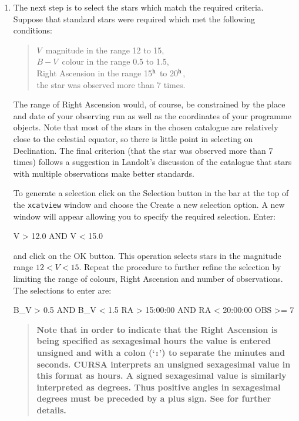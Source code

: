 \documentclass[twoside,11pt,nolof]{starlink}
\begin{document}
\begin{enumerate}
  \item The next step is to select the stars which match the required
   criteria.  Suppose that standard stars were required which met the
   following conditions:

  \begin{verse}
   $V$\, magnitude in the range 12 to 15,      \\
   $B - V$\, colour in the range 0.5 to 1.5,   \\
   Right Ascension in the range 15$^{\rm h}$ to 20$^{\rm h}$, \\
   the star was observed more than 7 times.
  \end{verse}

   The range of Right Ascension would, of course, be constrained by
   the place and date of your observing run as well as the coordinates
   of your programme objects.  Note that most of the stars in the chosen
   catalogue are relatively close to the celestial equator, so there is
   little point in selecting on Declination.  The final criterion (that
   the star was observed more than 7 times) follows a suggestion in
   Landolt's discussion of the catalogue\cite{LANDOLT92} that stars with
   multiple observations make better standards.

   To generate a selection click on the \textsf{Selection} button in the
   bar at the top of the \texttt{xcatview} window and choose the \textsf{Create a new selection} option.  A new window will appear allowing
   you to specify the required selection.  Enter:

\begin{terminalv}
V > 12.0 AND V < 15.0
\end{terminalv}

   and click on the \textsf{OK} button.  This operation selects stars in
   the magnitude range $12 < V < 15$.  Repeat the procedure to further
   refine the selection by limiting the range of colours, Right Ascension
   and number of observations.  The selections to enter are:

\begin{terminalv}
B_V > 0.5 AND B_V < 1.5
RA > 15:00:00 AND RA < 20:00:00
OBS >= 7
\end{terminalv}

  \begin{quote}
   \textbf{Note that in order to indicate that the Right Ascension is being
   specified as sexagesimal hours the value is entered unsigned and with
   a colon (`\texttt{:}') to separate the minutes and seconds.  CURSA
   interprets an unsigned sexagesimal value in this format as hours.  A
   signed sexagesimal value is similarly interpreted as degrees.  Thus
   positive angles in sexagesimal degrees must be preceded by a plus sign.
   See \cite{SUN190} for further details.}
  \end{quote}


\end{enumerate}
\end{document}

